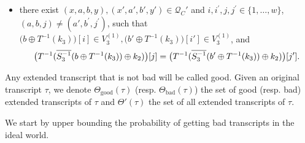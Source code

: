 \begin{definition}
\begin{itemize}[leftmargin=10mm]
	\item[\beleven] there exist $(x,a,b,y),(x',a',b',y') \in \mathcal{Q}_{C}'$ and $i, i^{\prime}, j, j^{\prime} \in\{1, \ldots, w\}$, $(a,b, j) \neq \left(a',b^{\prime}, j^{\prime}\right)$, such that $\big(b \oplus T^{-1}(k_3)\big)[i]\in V_{3}^{(1)}, \big(b' \oplus T^{-1}(k_3)\big)[i']\in V_{3}^{(1)}$, and
	$$\big(T^{-1}(\overline{S_3^{-1}}(b \oplus T^{-1}(k_3))\oplus k_2)\big)[j]=\big(T^{-1}(\overline{S_3^{-1}}(b' \oplus T^{-1}(k_3))\oplus k_2)\big)[j'].
	$$
\end{itemize}
Any extended transcript that is not bad will be called good. Given an original transcript $\tau$, we denote $\Theta_{\mathrm{good}}(\tau)$ (resp. $\Theta_{\mathrm{bad}}(\tau)$) the set of good (resp. bad) extended transcripts of $\tau$ and $\Theta'(\tau)$ the set of all extended transcripts of $\tau$.
\end{definition}





We start by upper bounding the probability of getting bad transcripts in the ideal world.


